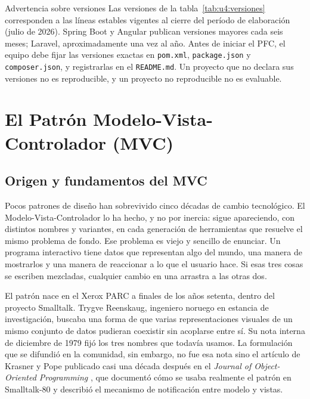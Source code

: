 \documentclass[11pt,a4paper,openany]{book}
\begin{document}
\begin{cajaadvertencia}{Advertencia sobre versiones}
	Las versiones de la tabla~\ref{tab:u4:versiones} corresponden a las líneas estables vigentes al cierre del período de elaboración (julio de 2026). Spring Boot y Angular publican versiones mayores cada seis meses; Laravel, aproximadamente una vez al año. Antes de iniciar el PFC, el equipo debe fijar las versiones exactas en \texttt{pom.xml}, \texttt{package.json} y \texttt{composer.json}, y registrarlas en el \texttt{README.md}. Un proyecto que no declara sus versiones no es reproducible, y un proyecto no reproducible no es evaluable.
\end{cajaadvertencia}

\section{El Patrón Modelo-Vista-Controlador (MVC)}
\label{sec:u4:mvc}

\subsection{Origen y fundamentos del MVC}
\label{sec:u4:origen}

Pocos patrones de diseño han sobrevivido cinco décadas de cambio tecnológico. El Modelo-Vista-Controlador lo ha hecho, y no por inercia: sigue apareciendo, con distintos nombres y variantes, en cada generación de herramientas que resuelve el mismo problema de fondo. Ese problema es viejo y sencillo de enunciar. Un programa interactivo tiene datos que representan algo del mundo, una manera de mostrarlos y una manera de reaccionar a lo que el usuario hace. Si esas tres cosas se escriben mezcladas, cualquier cambio en una arrastra a las otras dos.

El patrón nace en el Xerox PARC a finales de los años setenta, dentro del proyecto Smalltalk. Trygve Reenskaug, ingeniero noruego en estancia de investigación, buscaba una forma de que varias representaciones visuales de un mismo conjunto de datos pudieran coexistir sin acoplarse entre sí. Su nota interna de diciembre de 1979 fijó los tres nombres que todavía usamos. La formulación que se difundió en la comunidad, sin embargo, no fue esa nota sino el artículo de Krasner y Pope publicado casi una década después en el \emph{Journal of Object-Oriented Programming} \cite{krasner1988cookbook}, que documentó cómo se usaba realmente el patrón en Smalltalk-80 y describió el mecanismo de notificación entre modelo y vistas.
\end{document}
